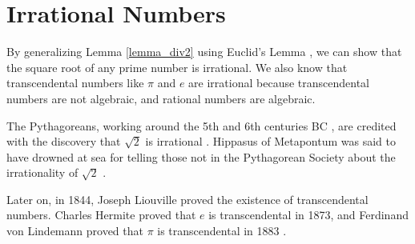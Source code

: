 \documentclass[12pt, letterpaper]{article}
\theoremstyle{definition}
\theoremstyle{definition}
\begin{document}
\section{Irrational Numbers} \label{sec4}

By generalizing Lemma \ref{lemma_div2} using Euclid's Lemma \cite{euclid_wiki}, we can show that
the square root of any prime number is irrational.
We also know that transcendental numbers \cite{transcendental_wiki} like \(\pi\) and \(e\)
are irrational because transcendental numbers are not algebraic, and rational numbers are algebraic.

The Pythagoreans, working around the 5th and 6th centuries BC \cite{pythag_wiki},
are credited with the discovery that \(\sqrt{2}\) is irrational \cite{sqrt2_wiki}.
Hippasus of Metapontum was said to have drowned at sea for telling those not in the
Pythagorean Society about the irrationality of \(\sqrt{2}\) \cite{hippasus_wiki}.

Later on, in 1844, Joseph Liouville proved the existence of transcendental numbers. Charles Hermite
proved that \(e\) is transcendental in 1873, and Ferdinand von Lindemann proved that \(\pi\) is
transcendental in 1883 \cite{transcendental_wiki}.






\end{document}
